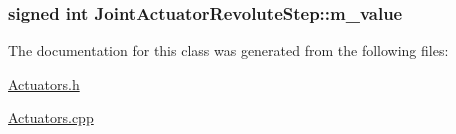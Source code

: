 \hypertarget{classJointActuatorRevoluteStep_ae9c426c866c77fde187ee3cddb3a6ca4}{
\subsubsection[{m\-\_\-value}]{\setlength{\rightskip}{0pt plus 5cm}signed int Joint\-Actuator\-Revolute\-Step\-::m\-\_\-value}}\label{classJointActuatorRevoluteStep_ae9c426c866c77fde187ee3cddb3a6ca4}


The documentation for this class was generated from the following files\-:\begin{DoxyCompactItemize}
\item 
\hyperlink{Actuators_8h}{Actuators.\-h}\item 
\hyperlink{Actuators_8cpp}{Actuators.\-cpp}\end{DoxyCompactItemize}
